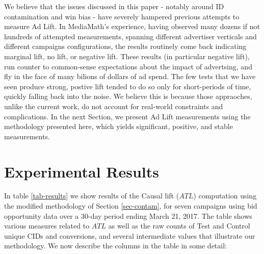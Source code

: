 \documentclass[11pt,a4paper]{article}
\theoremstyle{definition}
\theoremstyle{remark}
\theoremstyle{definition}
\theoremstyle{definition}
\theoremstyle{definition}
\theoremstyle{definition}
\theoremstyle{definition}
\theoremstyle{definition}
\begin{document}
We believe that the issues discussed in this paper - notably around ID contamination and win bias - have severely hampered previous attempts to measure Ad Lift. In MediaMath's experience, having observed many dozens if not hundreds of attempted measurements, spanning different advertiser verticals and different campaigns configurations, the results routinely come back indicating marginal lift, no lift, or negative lift. These results (in particular negative lift), run counter to common-sense expectations about the impact of advertsing, and fly in the face of many bilions of dollars of ad spend. The few tests that we have seen produce strong, postive lift tended to do so only for short-periods of time, quickly falling back into the noise. We believe this is because those appraoches, unlike the current work, do not account for real-world constraints and complications. In the next Section, we present Ad Lift measurements using the methodology presented here, which yields significant, positive, and stable measurements.


\section{Experimental Results} \label{sec-results}

In table \ref{tab-results} we show results of the Causal lift ($ATL$) computation using the modified methodology of Section \ref{sec-contam}, for seven campaigns using bid opportunity data over a 30-day period ending March 21, 2017. 
The table shows various measures related to $ATL$ as well as the raw counts of Test and Control unique CIDs and conversions, and several intermediate values that illustrate our methodology. 
We now describe the columns in the table in some detail:
\end{document}

